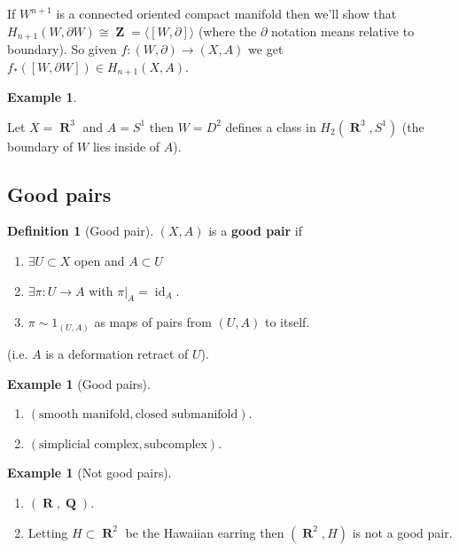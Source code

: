 \documentclass[10pt,]{book}
\newcommand{\terminology}[1]{\textbf{#1}}
\theoremstyle{plain}
\theoremstyle{definition}
\newtheorem{definition}[theorem]{Definition}
\newtheorem{example}[theorem]{Example}
\numberwithin{equation}{section}
\DeclareMathOperator{\id}{id}
\DeclareMathOperator{\QQ}{\mathbf{Q}}
\DeclareMathOperator{\RR}{\mathbf{R}}
\DeclareMathOperator{\ZZ}{\mathbf{Z}}
\begin{document}
              If \(W^{n+1}\) is a connected oriented compact manifold then we'll show that \(H_{n+1}(W,\partial W) \cong \ZZ = \langle [W,\partial] \rangle\) (where the \(\partial\) notation means relative to boundary).
              So given \(f\colon (W, \partial) \to (X,A)\) we get \(f_*([W,\partial W]) \in H_{n+1}(X,A)\).
\begin{example}\label{example-10}

                Let \(X = \RR^3\) and \(A= S^1\) then \(W = D^2\) defines a class in \(H_2(\RR^3,S^1)\) (the boundary of \(W\) lies inside of \(A\)).
              \end{example}
\typeout{************************************************}
\typeout{************************************************}
\subsection[Good pairs]{Good pairs}\label{subsection-8}
\begin{definition}[Good pair]\label{definition-16}
\((X,A)\) is a \terminology{good pair} if
              \begin{enumerate}
\item{}
                  \(\exists U \subset X\) open and \(A \subset U\)
                \item{}
                  \(\exists \pi \colon U \to A\) with \(\pi|_A = \id_A\).
                \item{}
                  \(\pi \sim 1_{(U,A)}\) as maps of pairs from \((U,A)\) to itself.
                \end{enumerate}

              (i.e. \(A\) is a deformation retract of \(U\)).
            \end{definition}
\begin{example}[Good pairs]\label{example-11}
\begin{enumerate}
\item{}
                  \((\text{smooth manifold}, \text{closed submanifold})\).
                \item{}
                  \((\text{simplicial complex}, \text{subcomplex})\).
                \end{enumerate}
\end{example}
\begin{example}[Not good pairs]\label{example-12}
\begin{enumerate}
\item{}
                  \((\RR, \QQ)\).
                \item{}
                  Letting \(H\subset \RR^2\) be the Hawaiian earring then \((\RR^2, H)\) is not a good pair.
                \end{enumerate}
\end{example}
\end{document}

